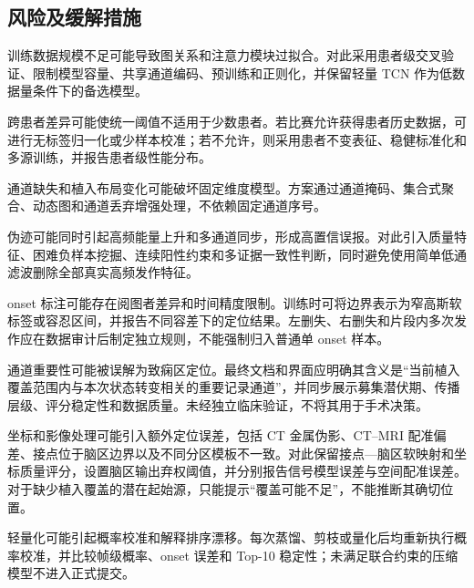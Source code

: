 \subsection{风险及缓解措施}

训练数据规模不足可能导致图关系和注意力模块过拟合。对此采用患者级交叉验证、限制模型容量、共享通道编码、预训练和正则化，并保留轻量 TCN 作为低数据量条件下的备选模型。

跨患者差异可能使统一阈值不适用于少数患者。若比赛允许获得患者历史数据，可进行无标签归一化或少样本校准；若不允许，则采用患者不变表征、稳健标准化和多源训练，并报告患者级性能分布。

通道缺失和植入布局变化可能破坏固定维度模型。方案通过通道掩码、集合式聚合、动态图和通道丢弃增强处理，不依赖固定通道序号。

伪迹可能同时引起高频能量上升和多通道同步，形成高置信误报。对此引入质量特征、困难负样本挖掘、连续阳性约束和多证据一致性判断，同时避免使用简单低通滤波删除全部真实高频发作特征。

onset 标注可能存在阅图者差异和时间精度限制。训练时可将边界表示为窄高斯软标签或容忍区间，并报告不同容差下的定位结果。左删失、右删失和片段内多次发作应在数据审计后制定独立规则，不能强制归入普通单 onset 样本。

通道重要性可能被误解为致痫区定位。最终文档和界面应明确其含义是“当前植入覆盖范围内与本次状态转变相关的重要记录通道”，并同步展示募集潜伏期、传播层级、评分稳定性和数据质量。未经独立临床验证，不将其用于手术决策。

坐标和影像处理可能引入额外定位误差，包括 CT 金属伪影、CT--MRI 配准偏差、接点位于脑区边界以及不同分区模板不一致。对此保留接点—脑区软映射和坐标质量评分，设置脑区输出弃权阈值，并分别报告信号模型误差与空间配准误差。对于缺少植入覆盖的潜在起始源，只能提示“覆盖可能不足”，不能推断其确切位置。

轻量化可能引起概率校准和解释排序漂移。每次蒸馏、剪枝或量化后均重新执行概率校准，并比较帧级概率、onset 误差和 Top-10 稳定性；未满足联合约束的压缩模型不进入正式提交。

